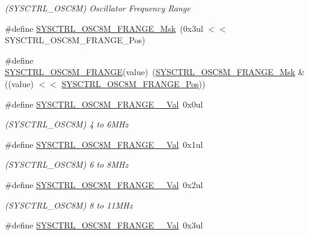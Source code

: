 \begin{DoxyCompactItemize}
\begin{DoxyCompactList}\small\item\em (S\+Y\+S\+C\+T\+R\+L\+\_\+\+O\+S\+C8M) Oscillator Frequency Range \end{DoxyCompactList}\item 
\#define \mbox{\hyperlink{group___s_a_m_d21___s_y_s_c_t_r_l_ga6565e6ff4c5d2a78c689608487ba8690}{S\+Y\+S\+C\+T\+R\+L\+\_\+\+O\+S\+C8\+M\+\_\+\+F\+R\+A\+N\+G\+E\+\_\+\+Msk}}~(0x3ul $<$$<$ S\+Y\+S\+C\+T\+R\+L\+\_\+\+O\+S\+C8\+M\+\_\+\+F\+R\+A\+N\+G\+E\+\_\+\+Pos)
\item 
\#define \mbox{\hyperlink{group___s_a_m_d21___s_y_s_c_t_r_l_gac070f2bea5484db793dad0591ea517f6}{S\+Y\+S\+C\+T\+R\+L\+\_\+\+O\+S\+C8\+M\+\_\+\+F\+R\+A\+N\+GE}}(value)~(\mbox{\hyperlink{group___s_a_m_d21___s_y_s_c_t_r_l_ga6565e6ff4c5d2a78c689608487ba8690}{S\+Y\+S\+C\+T\+R\+L\+\_\+\+O\+S\+C8\+M\+\_\+\+F\+R\+A\+N\+G\+E\+\_\+\+Msk}} \& ((value) $<$$<$ \mbox{\hyperlink{group___s_a_m_d21___s_y_s_c_t_r_l_ga29d2774a43cd9d3b53fde14cf70b27f6}{S\+Y\+S\+C\+T\+R\+L\+\_\+\+O\+S\+C8\+M\+\_\+\+F\+R\+A\+N\+G\+E\+\_\+\+Pos}}))
\item 
\#define \mbox{\hyperlink{group___s_a_m_d21___s_y_s_c_t_r_l_ga08f30f18cc32f3878dd2d88778f251d7}{S\+Y\+S\+C\+T\+R\+L\+\_\+\+O\+S\+C8\+M\+\_\+\+F\+R\+A\+N\+G\+E\+\_\+\_\+\+Val}}~0x0ul
\begin{DoxyCompactList}\small\item\em (S\+Y\+S\+C\+T\+R\+L\+\_\+\+O\+S\+C8M) 4 to 6M\+Hz \end{DoxyCompactList}\item 
\#define \mbox{\hyperlink{group___s_a_m_d21___s_y_s_c_t_r_l_ga90cd336bca0a2b659b2381bdffe38d5e}{S\+Y\+S\+C\+T\+R\+L\+\_\+\+O\+S\+C8\+M\+\_\+\+F\+R\+A\+N\+G\+E\+\_\+\_\+\+Val}}~0x1ul
\begin{DoxyCompactList}\small\item\em (S\+Y\+S\+C\+T\+R\+L\+\_\+\+O\+S\+C8M) 6 to 8M\+Hz \end{DoxyCompactList}\item 
\#define \mbox{\hyperlink{group___s_a_m_d21___s_y_s_c_t_r_l_gaf03d2cb29a63878c283bab0b3815d3ad}{S\+Y\+S\+C\+T\+R\+L\+\_\+\+O\+S\+C8\+M\+\_\+\+F\+R\+A\+N\+G\+E\+\_\+\_\+\+Val}}~0x2ul
\begin{DoxyCompactList}\small\item\em (S\+Y\+S\+C\+T\+R\+L\+\_\+\+O\+S\+C8M) 8 to 11M\+Hz \end{DoxyCompactList}\item 
\#define \mbox{\hyperlink{group___s_a_m_d21___s_y_s_c_t_r_l_ga359e0a7fa70deeef922cdfae0a782447}{S\+Y\+S\+C\+T\+R\+L\+\_\+\+O\+S\+C8\+M\+\_\+\+F\+R\+A\+N\+G\+E\+\_\+\_\+\+Val}}~0x3ul

\end{DoxyCompactItemize}

